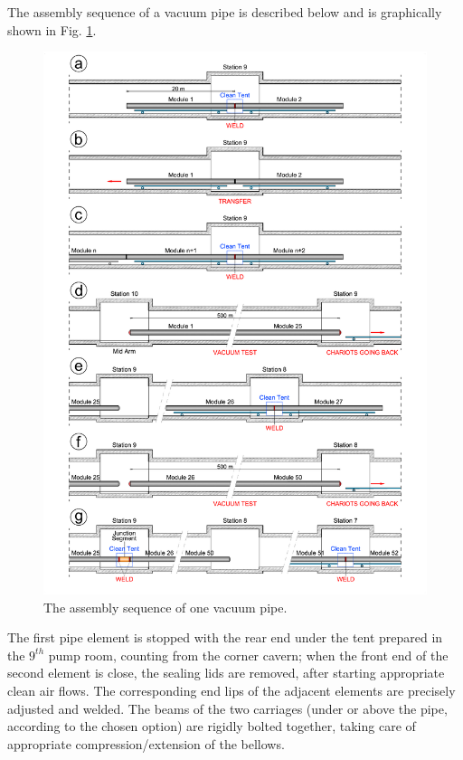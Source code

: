 The assembly sequence of a vacuum pipe is described below and is graphically shown in Fig. \ref{fig:VAC8}.

\begin{figure}
\begin{center}
\includegraphics[width=\textwidth]{Sec_SiteInfra/Figures/VAC8.pdf}
\caption{The assembly sequence of one vacuum pipe.}
\label{fig:VAC8}
\end{center}
\end{figure}

The first pipe element is stopped with the rear end under the tent prepared in the $9^{th}$ pump room, counting from the corner cavern; when the front end of the second element is close, the sealing lids are removed, after starting appropriate clean air flows. The corresponding end lips of the adjacent elements are precisely adjusted and welded. The beams of the two carriages (under or above the pipe, according to the chosen option) are rigidly bolted together, taking care of appropriate compression/extension of the bellows.

